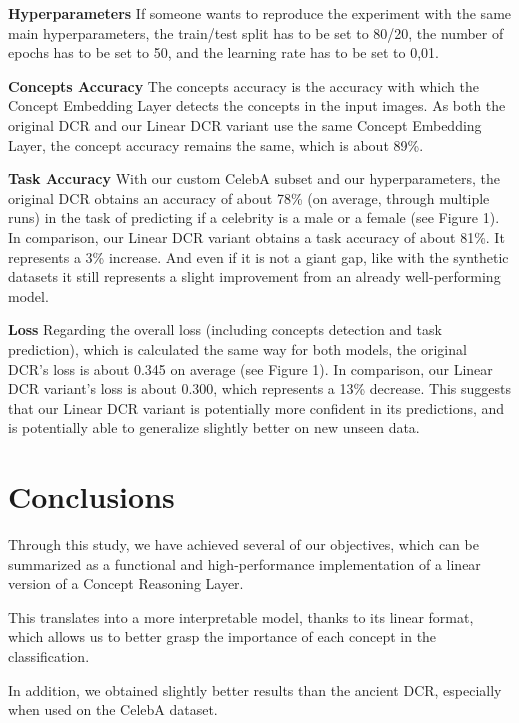 \documentclass[sigconf, nonacm]{acmart}
\begin{document}
\textbf{Hyperparameters} If someone wants to reproduce the experiment with the same main hyperparameters, the train/test split has to be set to 80/20, the number of epochs has to be set to 50, and the learning rate has to be set to 0,01. \vspace{8pt}

\textbf{Concepts Accuracy} The concepts accuracy is the accuracy with which the Concept Embedding Layer detects the concepts in the input images. As both the original DCR and our Linear DCR variant use the same Concept Embedding Layer, the concept accuracy remains the same, which is about 89\%. \vspace{8pt}

\textbf{Task Accuracy} With our custom CelebA subset and our hyperparameters, the original DCR obtains an accuracy of about 78\% (on average, through multiple runs) in the task of predicting if a celebrity is a male or a female (see Figure 1). In comparison, our Linear DCR variant obtains a task accuracy of about 81\%. It represents a 3\% increase. And even if it is not a giant gap, like with the synthetic datasets it still represents a slight improvement from an already well-performing model. \vspace{8pt}

\textbf{Loss} Regarding the overall loss (including concepts detection and task prediction), which is calculated the same way for both models, the original DCR's loss is about 0.345 on average (see Figure 1). In comparison, our Linear DCR variant's loss is about 0.300, which represents a 13\% decrease. This suggests that our Linear DCR variant is potentially more confident in its predictions, and is potentially able to generalize slightly better on new unseen data.  \vspace{8pt}


\section{Conclusions}
\vspace{2pt}
Through this study, we have achieved several of our objectives, which can be summarized as a functional and high-performance implementation of a linear version of a Concept Reasoning Layer.

This translates into a more interpretable model, thanks to its linear format, which allows us to better grasp the importance of each concept in the classification.

In addition, we obtained slightly better results than the ancient DCR, especially when used on the CelebA dataset.
\end{document}
